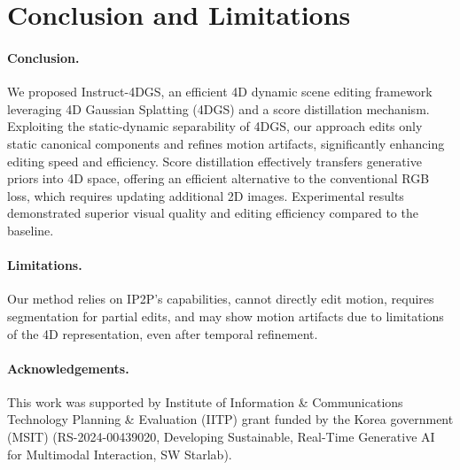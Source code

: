 \section{Conclusion and Limitations}
\vspace{-2mm}
\paragraph{Conclusion.} We proposed Instruct-4DGS, an efficient 4D dynamic scene editing framework leveraging 4D Gaussian Splatting (4DGS) and a score distillation mechanism. Exploiting the static-dynamic separability of 4DGS, our approach edits only static canonical components and refines motion artifacts, significantly enhancing editing speed and efficiency. Score distillation effectively transfers generative priors into 4D space, offering an efficient alternative to the conventional RGB loss, which requires updating additional 2D images. Experimental results demonstrated superior visual quality and editing efficiency compared to the baseline.

\vspace{-4mm}
\paragraph{Limitations.} Our method relies on IP2P's capabilities, cannot directly edit motion, requires segmentation for partial edits, and may show motion artifacts due to limitations of the 4D representation, even after temporal refinement.

\vspace{-4mm}
\paragraph{Acknowledgements.} This work was supported by Institute of Information \& Communications Technology Planning \& Evaluation (IITP) grant funded by the Korea government (MSIT) (RS-2024-00439020, Developing Sustainable, Real-Time Generative AI for Multimodal Interaction, SW Starlab).
